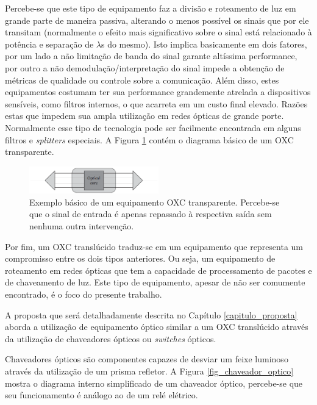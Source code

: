Percebe-se que este tipo de equipamento faz a divisão e roteamento de luz em grande parte de maneira passiva, alterando o menos possível os sinais que por ele transitam (normalmente o efeito mais significativo sobre o sinal está relacionado à potência e separação de $\lambda$s do mesmo). Isto implica basicamente em dois fatores, por um lado a não limitação de banda do sinal garante altíssima performance, por outro a não demodulação/interpretação do sinal impede a obtenção de métricas de qualidade ou controle sobre a comunicação. Além disso, estes equipamentos costumam ter sua performance grandemente atrelada a dispositivos sensíveis, como filtros internos, o que acarreta em um custo final elevado. Razões estas que impedem sua ampla utilização em redes ópticas de grande porte. Normalmente esse tipo de tecnologia pode ser facilmente encontrada em alguns filtros e \emph{splitters} especiais. A Figura \ref{fig_oxc_optico} contém o diagrama básico de um OXC transparente. 

\begin{figure}[!htb]
	\centering
	\includegraphics[width=0.5\textwidth]{./figuras/OXC-Optico.png} %
	\caption[Exemplo básico de OXC óptico]{Exemplo básico de um equipamento OXC transparente. Percebe-se que o sinal de entrada é apenas repassado à respectiva saída sem nenhuma outra intervenção.}
	\label{fig_oxc_optico}
\end{figure}

Por fim, um OXC translúcido traduz-se em um equipamento que representa um compromisso entre os dois tipos anteriores. Ou seja, um equipamento de roteamento em redes ópticas que tem a capacidade de processamento de pacotes e de chaveamento de luz. Este tipo de equipamento, apesar de não ser comumente encontrado, é o foco do presente trabalho.

A proposta que será detalhadamente descrita no Capítulo \ref{capitulo_proposta} aborda a utilização de equipamento óptico similar a um OXC translúcido através da utilização de chaveadores ópticos ou \emph{switches} ópticos.

Chaveadores ópticos são componentes capazes de desviar um feixe luminoso através da utilização de um prisma refletor. A Figura \ref{fig_chaveador_optico} mostra o diagrama interno simplificado de um chaveador óptico, percebe-se que seu funcionamento é análogo ao de um relé elétrico.

